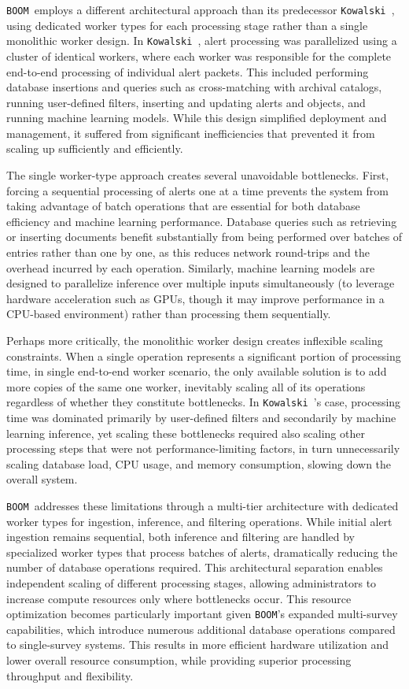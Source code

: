 \documentclass[twocolumn]{aastex631}
\newcommand{\boom}{\texttt{BOOM }}
\newcommand{\kowalski}{\texttt{Kowalski }}
\begin{document}
\boom employs a different architectural approach than its predecessor \kowalski, using dedicated worker types for each processing stage rather than a single monolithic worker design. In \kowalski, alert processing was parallelized using a cluster of identical workers, where each worker was responsible for the complete end-to-end processing of individual alert packets. This included performing database insertions and queries such as cross-matching with archival catalogs, running user-defined filters, inserting and updating alerts and objects, and running machine learning models. While this design simplified deployment and management, it suffered from significant inefficiencies that prevented it from scaling up sufficiently and efficiently.

The single worker-type approach creates several unavoidable bottlenecks. First, forcing a sequential processing of alerts one at a time prevents the system from taking advantage of batch operations that are essential for both database efficiency and machine learning performance. Database queries such as retrieving or inserting documents benefit substantially from being performed over batches of entries rather than one by one, as this reduces network round-trips and the overhead incurred by each operation. Similarly, machine learning models are designed to parallelize inference over multiple inputs simultaneously (to leverage hardware acceleration such as GPUs, though it may improve performance in a CPU-based environment) rather than processing them sequentially.

Perhaps more critically, the monolithic worker design creates inflexible scaling constraints. When a single operation represents a significant portion of processing time, in single end-to-end worker scenario, the only available solution is to add more copies of the same one worker, inevitably scaling all of its operations regardless of whether they constitute bottlenecks. In \kowalski's case, processing time was dominated primarily by user-defined filters and secondarily by machine learning inference, yet scaling these bottlenecks required also scaling other processing steps that were not performance-limiting factors, in turn unnecessarily scaling database load, CPU usage, and memory consumption, slowing down the overall system.

\boom addresses these limitations through a multi-tier architecture with dedicated worker types for ingestion, inference, and filtering operations. While initial alert ingestion remains sequential, both inference and filtering are handled by specialized worker types that process batches of alerts, dramatically reducing the number of database operations required. This architectural separation enables independent scaling of different processing stages, allowing administrators to increase compute resources only where bottlenecks occur. This resource optimization becomes particularly important given \texttt{BOOM}'s expanded multi-survey capabilities, which introduce numerous additional database operations compared to single-survey systems. This results in more efficient hardware utilization and lower overall resource consumption, while providing superior processing throughput and flexibility.
\end{document}
